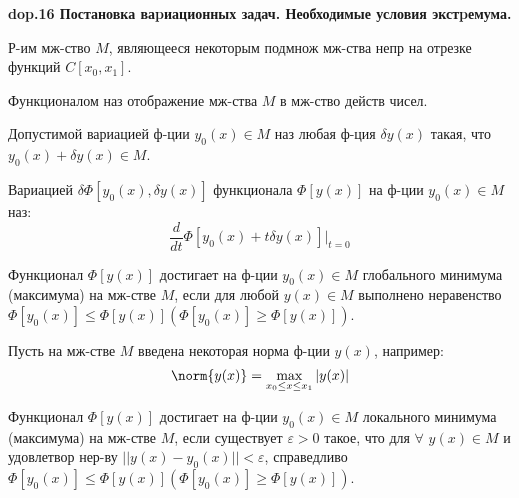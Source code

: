 \textbf{\LARGE dop.16 Постановка ваpиационных задач. Необходимые условия экстpемума.}

Р-им мж-ство $M$, являющееся некоторым подмнож
мж-ства непр на отрезке функций $C[x_0, x_1]$.

\begin{definition}
    Функционалом наз отображение мж-ства $M$ в мж-ство действ чисел.
\end{definition}

\begin{definition}
    Допустимой вариацией ф-ции $y_0(x) \in M$ наз любая ф-ция $\delta y(x)$ такая, что $y_0(x) + \delta y(x) \in M$.
\end{definition}

\begin{definition}
    Вариацией $\delta\Phi[y_0(x), \delta y(x)]$ функционала
    $\Phi[y(x)]$ на ф-ции $y_0(x) \in M$ наз: $$\frac{d}{dt}\Phi[y_0(x)+t\delta y(x)]\Big|_{t=0}$$
\end{definition}

\begin{definition}
    Функционал $\Phi[y(x)]$ достигает на ф-ции
    $y_0(x) \in M$ глобального минимума (максимума) на мж-стве $M$, если для любой $y(x) \in M$ выполнено неравенство $\Phi[y_0(x)]\leq\Phi[y(x)]  (\Phi[y_0(x)]\geq\Phi[y(x)])$.
\end{definition}

Пусть на мж-стве $M$ введена некоторая норма ф-ции $y(x)$, например:
$$\norm{y(x)}=\displaystyle\max_{x_0\leq x \leq x_1} |y(x)|$$

\begin{definition}
    Функционал $\Phi[y(x)]$ достигает на ф-ции
    $y_0(x)\in M$ локального минимума (максимума) на мж-стве $M$, если
    существует $\varepsilon > 0$ такое, что для $\forall$ $y(x) \in M$ и удовлетвор нер-ву $||y(x) - y_0(x)|| < \varepsilon$, справедливо $\Phi[y_0(x)] \leq \Phi[y(x)] (\Phi[y_0(x)] \geq \Phi[y(x)])$.
\end{definition}

